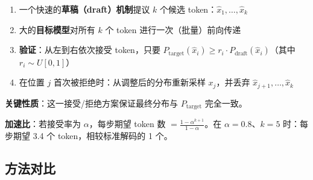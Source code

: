 \begin{keybox}[投机解码框架]
\begin{enumerate}
  \item 一个快速的\textbf{草稿（draft）机制}提议 $k$ 个候选 token：$\hat{x}_1, \ldots, \hat{x}_k$
  \item 大的\textbf{目标模型}对所有 $k$ 个 token 进行一次（批量）前向传递
  \item \textbf{验证}：从左到右依次接受 token，只要 $P_{\text{target}}(\hat{x}_i) \geq r_i \cdot P_{\text{draft}}(\hat{x}_i)$（其中 $r_i \sim U[0,1]$）
  \item 在位置 $j$ 首次被拒绝时：从调整后的分布重新采样 $x_j$，并丢弃 $\hat{x}_{j+1}, \ldots, \hat{x}_k$
\end{enumerate}

\textbf{关键性质}：这一接受/拒绝方案保证最终分布与 $P_{\text{target}}$ 完全一致。

\textbf{加速比}：若接受率为 $\alpha$，每步期望 token 数 $= \frac{1 - \alpha^{k+1}}{1 - \alpha}$。在 $\alpha=0.8$、$k=5$ 时：每步期望 3.4 个 token，相较标准解码的 1 个。
\end{keybox}

\subsection{方法对比}
\label{methods-comparison}

